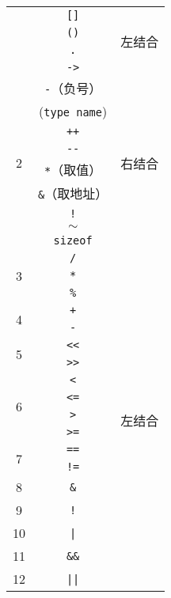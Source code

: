 \documentclass{article}
\begin{document}
\begin{longtable}{|c|c|c|}
    {\multirow{4}{*}{1}} 
     & \texttt{{[}{]}} & \multirow{4}{*}{左结合} \\ \cline{2-2}
     & \texttt{()} &  \\ \cline{2-2}
     & \texttt{.} &  \\ \cline{2-2}
     & \texttt{->} &  \\ \hline
    \multirow{9}{*}{2}
     & \texttt{-}（负号） & \multirow{9}{*}{右结合} \\ \cline{2-2}
     & (\texttt{type name}) &  \\ \cline{2-2}
     & \texttt{++} &  \\ \cline{2-2}
     & \texttt{{-}-} &  \\ \cline{2-2}
     & \texttt{*}（取值） &  \\ \cline{2-2}
     & \texttt{\&}（取地址） &  \\ \cline{2-2}
     & \texttt{!} &  \\ \cline{2-2}
     & \texttt{$\sim$} &  \\ \cline{2-2}
     & \texttt{sizeof} &  \\ \hline
    \multirow{3}{*}{3} 
     & \texttt{/} & \multirow{18}{*}{左结合} \\ \cline{2-2}
     & \texttt{*} &  \\ \cline{2-2}
     & \texttt{\%} &  \\ \cline{1-2}
    \multirow{2}{*}{4}
     & \texttt{+} &  \\ \cline{2-2}
     & \texttt{-} &  \\ \cline{1-2}
    \multirow{2}{*}{5} 
     & \texttt{{<}{<}} &  \\ \cline{2-2}
     & \texttt{{>}{>}} &  \\ \cline{1-2}
    \multirow{4}{*}{6} 
     & \texttt{<} &  \\ \cline{2-2}
     & \texttt{<=} &  \\ \cline{2-2}
     & \texttt{>} &  \\ \cline{2-2}
     & \texttt{>=} &  \\ \cline{1-2}
    \multirow{2}{*}{7} 
     & \texttt{==} &  \\ \cline{2-2}
     & \texttt{!=} &  \\ \cline{1-2}
    8 & \texttt{\&} &  \\ \cline{1-2}
    9 & \texttt{!} &  \\ \cline{1-2}
    10 & \texttt{|} &  \\ \cline{1-2}
    11 & \texttt{\&\&} &  \\ \cline{1-2}
    12 & \texttt{||} &  \\ \hline

\end{longtable}
\end{document}
